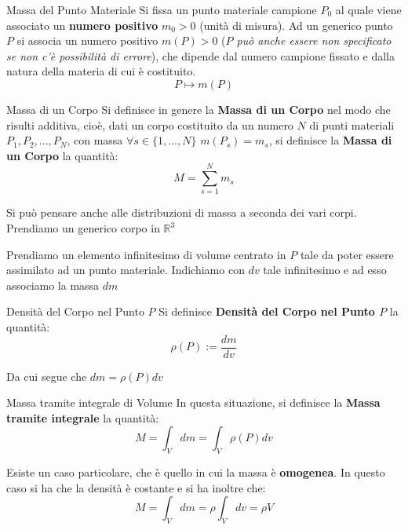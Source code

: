 \documentclass[11pt,a4paper,twoside]{article}
\theoremstyle{definition}
\begin{document}
\begin{defn}{Massa del Punto Materiale}{}
	Si fissa un punto materiale campione $P_0$ al quale viene associato un \textbf{numero positivo} $m_0>0$ (unità di misura). Ad un generico punto $P$ si associa un numero positivo $m(P)>0$ (\textit{$P$ può anche essere non specificato se non c'è possibilità di errore}), che dipende dal numero campione fissato e dalla natura della materia di cui è costituito.
	\[ P \mapsto m(P) \]
\end{defn}

\begin{defn}{Massa di un Corpo}{}
	Si definisce in genere la \textbf{Massa di un Corpo} nel modo che risulti additiva, cioè, dati un corpo costituito da un numero $N$ di punti materiali $P_1,P_2,...,P_N$, con massa $\forall s \in \{1,...,N\}$ $m(P_s) =m_s$, si definisce la \textbf{Massa di un Corpo} la quantità:
	\[ M = \sum_{s = 1}^N m_s \]
\end{defn}

Si può pensare anche alle distribuzioni di massa a seconda dei vari corpi.\\
Prendiamo un generico corpo in $\mathbb R^3$
\begin{center}
\end{center}
Prendiamo un elemento infinitesimo di volume centrato in $P$ tale da poter essere assimilato ad un punto materiale. Indichiamo con $dv$ tale infinitesimo e ad esso associamo la massa $dm$

\begin{defn}{Densità del Corpo nel Punto $P$}{}
	Si definisce \textbf{Densità del Corpo nel Punto $P$} la quantità:
	\[\rho(P):= \frac{dm}{dv}\]
\end{defn}

Da cui segue che $dm = \rho(P)dv$

\begin{defn}{Massa tramite integrale di Volume}{}
	In questa situazione, si definisce la \textbf{Massa tramite integrale} la quantità:
	\[ M = \int_V dm = \int_V \rho(P)dv \]
\end{defn}

Esiste un caso particolare, che è quello in cui la massa è \textbf{omogenea}. In questo caso si ha che la densità è costante e si ha inoltre che:
\[ M = \int_V dm = \rho \int_V dv = \rho V \]
\end{document}
